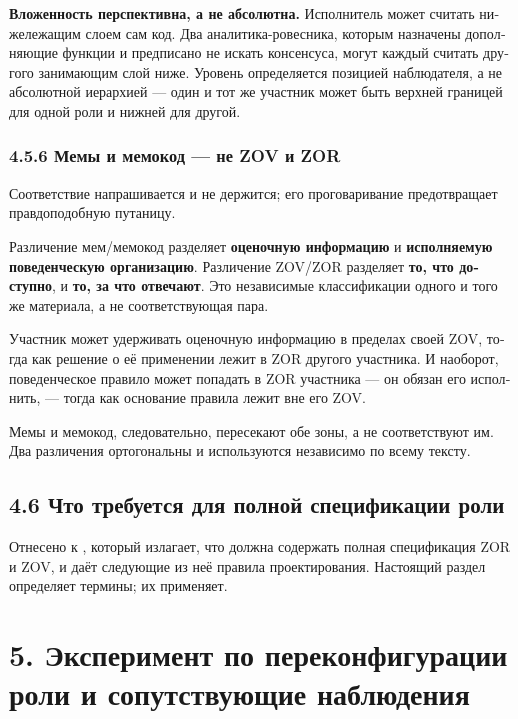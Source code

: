 \begin{russian}
\textbf{Вложенность перспективна, а не абсолютна.} Исполнитель может считать нижележащим слоем сам код. Два аналитика-ровесника, которым назначены дополняющие функции и предписано не искать консенсуса, могут каждый считать другого занимающим слой ниже. Уровень определяется позицией наблюдателя, а не абсолютной иерархией — один и тот же участник может быть верхней границей для одной роли и нижней для другой.


\subsubsection*{4.5.6 Мемы и мемокод — не ZOV и ZOR}
\label{sec:ru:4.5.6}

Соответствие напрашивается и не держится; его проговаривание предотвращает правдоподобную путаницу.

Различение мем/мемокод разделяет \textbf{оценочную информацию} и \textbf{исполняемую поведенческую организацию}. Различение ZOV/ZOR разделяет \textbf{то, что доступно}, и \textbf{то, за что отвечают}. Это независимые классификации одного и того же материала, а не соответствующая пара.

Участник может удерживать оценочную информацию в пределах своей ZOV, тогда как решение о её применении лежит в ZOR другого участника. И наоборот, поведенческое правило может попадать в ZOR участника — он обязан его исполнить, — тогда как основание правила лежит вне его ZOV.

Мемы и мемокод, следовательно, пересекают обе зоны, а не соответствуют им. Два различения ортогональны и используются независимо по всему тексту.


\subsection*{4.6 Что требуется для полной спецификации роли}
\label{sec:ru:4.6}

Отнесено к , который излагает, что должна содержать полная спецификация ZOR и ZOV, и даёт следующие из неё правила проектирования. Настоящий раздел определяет термины;  их применяет.


\section*{5. Эксперимент по переконфигурации роли и сопутствующие наблюдения}
\label{sec:ru:5}


\end{russian}
